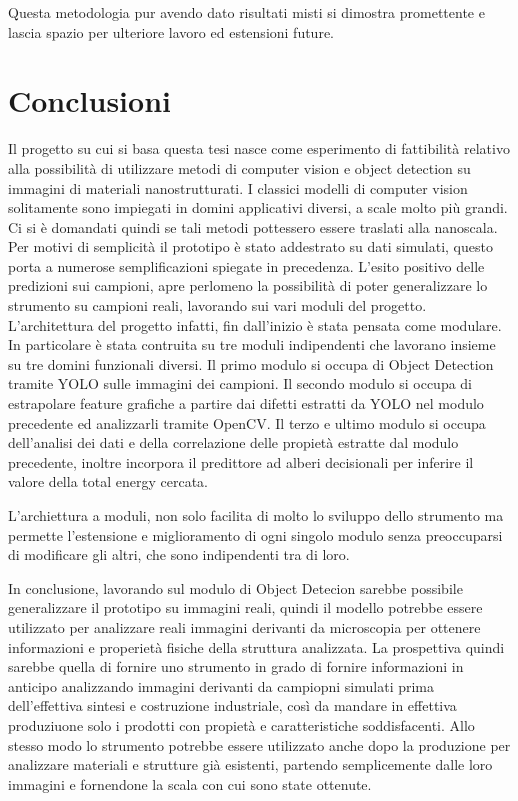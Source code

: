 \documentclass[12pt,a4paper,openright,twoside]{report}
\begin{document}
Questa metodologia pur avendo dato risultati misti si dimostra promettente e lascia spazio per ulteriore lavoro ed estensioni future. 


\begingroup
\let\clearpage\relax
\chapter*{Conclusioni}

Il progetto su cui si basa questa tesi nasce come esperimento di fattibilità relativo alla possibilità di utilizzare metodi di computer vision e object detection su immagini di materiali nanostrutturati. 
I classici modelli di computer vision solitamente sono impiegati in domini applicativi diversi, a scale molto più grandi. Ci si è domandati quindi se tali metodi pottessero essere traslati alla nanoscala. 
Per motivi di semplicità il prototipo è stato addestrato su dati simulati, questo porta a numerose semplificazioni spiegate in precedenza. 
L'esito positivo delle predizioni sui campioni, apre perlomeno la possibilità di poter generalizzare lo strumento su campioni reali, lavorando sui vari moduli del progetto.
L'architettura del progetto infatti, fin dall'inizio è stata pensata come modulare. In particolare è stata contruita su tre moduli indipendenti che lavorano insieme su tre domini funzionali diversi. Il primo modulo si occupa di Object Detection tramite YOLO sulle immagini dei campioni. Il secondo modulo si occupa di estrapolare feature grafiche a partire dai difetti estratti da YOLO nel modulo precedente ed analizzarli tramite OpenCV. Il terzo e ultimo modulo si occupa dell'analisi dei dati e della correlazione delle propietà estratte dal modulo precedente, inoltre incorpora il predittore ad alberi decisionali per inferire il valore della total energy cercata. 

L'archiettura a moduli, non solo facilita di molto lo sviluppo dello strumento ma permette l'estensione e miglioramento di ogni singolo modulo senza preoccuparsi di modificare gli altri, che sono indipendenti tra di loro.

In conclusione, lavorando sul modulo di Object Detecion sarebbe possibile generalizzare il prototipo su immagini reali, quindi il modello potrebbe essere utilizzato per analizzare reali immagini derivanti da microscopia per ottenere informazioni e properietà fisiche della struttura analizzata. 
La prospettiva quindi sarebbe quella di fornire uno strumento in grado di fornire informazioni in anticipo analizzando immagini derivanti da campiopni simulati prima dell'effettiva sintesi e costruzione industriale, così da mandare in effettiva produziuone solo i prodotti con propietà e caratteristiche soddisfacenti. 
Allo stesso modo lo strumento potrebbe essere utilizzato anche dopo la produzione per analizzare materiali e strutture già esistenti, partendo semplicemente dalle loro immagini e fornendone la scala con cui sono state ottenute.
\end{document}
